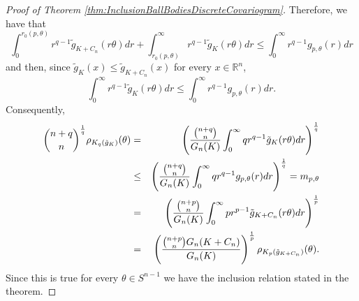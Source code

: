 \documentclass[10pt]{amsart}
\def\R{\mathbb{R}}
\numberwithin{equation}{section}
\begin{document}
\begin{proof}[Proof of Theorem \ref{thm:InclusionBallBodiesDiscreteCovariogram}]
Therefore, we have that
$$
\int_0^{r_0(p,\theta)}r^{q-1}\tilde{g}_{K+C_n}(r\theta)dr+\int_{r_0(p,\theta)}^\infty r^{q-1}\tilde{g}_{K}(r\theta)dr\leq\int_0^\infty r^{q-1}g_{p,\theta}(r)dr
$$
and then, since $\tilde{g}_K(x)\leq\tilde{g}_{K+C_n}(x)$ for every $x\in\R^n$,
$$
\int_{0}^\infty r^{q-1}\tilde{g}_{K}(r\theta)dr\leq\int_0^\infty r^{q-1}g_{p,\theta}(r)dr.
$$
Consequently,
\begin{eqnarray*}
{{n+q}\choose{n}}^\frac{1}{q}\rho_{K_q(\tilde{g}_K)}(\theta)&=&\left(\frac{{{n+q}\choose{n}}}{G_n(K)}\int_0^\infty qr^{q-1}\tilde{g}_{K}(r\theta)dr\right)^\frac{1}{q}\cr
&\leq&\left(\frac{{{n+q}\choose{n}}}{G_n(K)}\int_0^\infty qr^{q-1}g_{p,\theta}(r)dr\right)^\frac{1}{q}=m_{p,\theta}\cr
&=&\left(\frac{{{n+p}\choose{n}}}{G_n(K)}\int_0^\infty pr^{p-1}\tilde{g}_{K+C_n}(r\theta)dr\right)^\frac{1}{p}\cr
&=&\left(\frac{{{n+p}\choose{n}}G_n(K+C_n)}{G_n(K)}\right)^\frac{1}{p}\rho_{K_p(\tilde{g}_{K+C_n})}(\theta).
\end{eqnarray*}
Since this is true for every $\theta\in S^{n-1}$ we have the inclusion relation stated in the theorem.
\end{proof}
\end{document}
